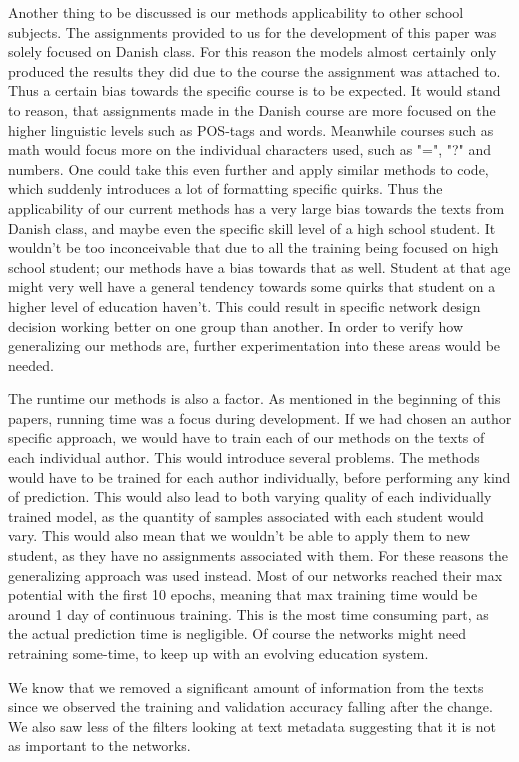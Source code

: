 Another thing to be discussed is our methods applicability to other school
subjects. The assignments provided to us for the development of this paper was
solely focused on Danish class. For this reason the models almost certainly only
produced the results they did due to the course the assignment was attached to.
Thus a certain bias towards the specific course is to be expected. It would
stand to reason, that assignments made in the Danish course are more focused
on the higher linguistic levels such as POS-tags and words. Meanwhile courses
such as math would focus more on the individual characters used, such as "=",
"?" and numbers. One could take this even further and apply similar methods
to code, which suddenly introduces a lot of formatting specific quirks. Thus
the applicability of our current methods has a very large bias towards the
texts from Danish class, and maybe even the specific skill level of a high
school student. It wouldn't be too inconceivable that due to all the training
being focused on high school student; our methods have a bias towards that as
well. Student at that age might very well have a general tendency towards some
quirks that student on a higher level of education haven't. This could result in
specific network design decision working better on one group than another. In
order to verify how generalizing our methods are, further experimentation into
these areas would be needed.

The runtime our methods is also a factor. As mentioned in the beginning of
this papers, running time was a focus during development. If we had chosen an
author specific approach, we would have to train each of our methods on the
texts of each individual author. This would introduce several problems. The
methods would have to be trained for each author individually, before performing
any kind of prediction. This would also lead to both varying quality of each
individually trained model, as the quantity of samples associated with each
student would vary. This would also mean that we wouldn't be able to apply them
to new student, as they have no assignments associated with them. For these
reasons the generalizing approach was used instead. Most of our networks reached
their max potential with the first 10 epochs, meaning that max training time
would be around 1 day of continuous training. This is the most time consuming
part, as the actual prediction time is negligible. Of course the networks might
need retraining some-time, to keep up with an evolving education system.

We know that we removed a significant amount of information from the texts since
we observed the training and validation accuracy falling after the change. We
also saw less of the filters looking at text metadata suggesting that it is not
as important to the networks.


